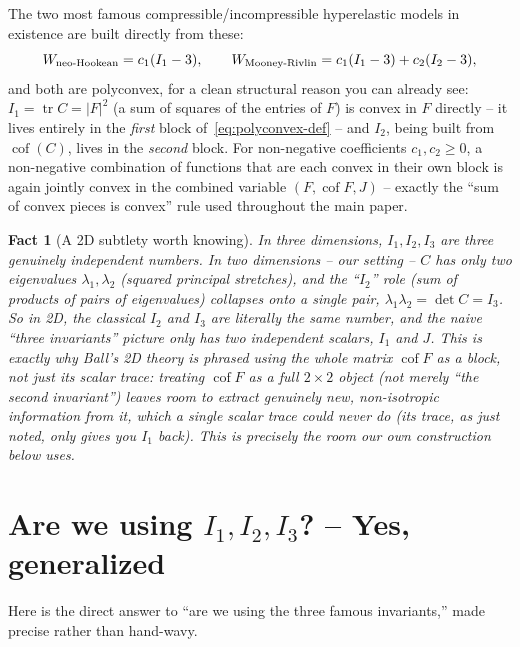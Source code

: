 \documentclass[11pt,a4paper]{article}
\newtheorem{fact}{Fact}
\newcommand{\Cof}{\operatorname{cof}}
\newcommand{\tr}{\operatorname{tr}}
\begin{document}
The two most famous compressible/incompressible hyperelastic models in
existence are built directly from these:
\[
 W_{\rm neo\text{-}Hookean}=c_1(I_1-3), \qquad
 W_{\rm Mooney\text{-}Rivlin}=c_1(I_1-3)+c_2(I_2-3),
\]
and both are polyconvex, for a clean structural reason you can already
see: $I_1=\tr C=|F|^2$ (a sum of squares of the entries of $F$) is
convex in $F$ directly -- it lives entirely in the \emph{first} block
of~\eqref{eq:polyconvex-def} -- and $I_2$, being built from $\Cof(C)$,
lives in the \emph{second} block. For non-negative coefficients $c_1,
c_2\geq0$, a non-negative combination of functions that are each convex
in their own block is again jointly convex in the combined variable
$(F,\Cof F,J)$ -- exactly the ``sum of convex pieces is convex'' rule
used throughout the main paper.

\begin{fact}[A 2D subtlety worth knowing]
\label{fact:2d-degeneracy}
In three dimensions, $I_1,I_2,I_3$ are three genuinely independent
numbers. In two dimensions -- our setting -- $C$ has only two
eigenvalues $\lambda_1,\lambda_2$ (squared principal stretches), and
the ``$I_2$'' role (sum of products of pairs of eigenvalues) collapses
onto a single pair, $\lambda_1\lambda_2=\det C=I_3$. So in 2D, the
classical $I_2$ and $I_3$ are literally the same number, and the naive
``three invariants'' picture only has two independent scalars,
$I_1$ and $J$. This is exactly why Ball's 2D theory is phrased using
the whole \emph{matrix} $\Cof F$ as a block, not just its scalar trace:
treating $\Cof F$ as a full $2\times2$ object (not merely
``the second invariant'') leaves room to extract genuinely new,
non-isotropic information from it, which a single scalar trace could
never do (its trace, as just noted, only gives you $I_1$ back). This is
precisely the room our own construction below uses.
\end{fact}

\section{Are we using $I_1,I_2,I_3$? -- Yes, generalized}
\label{sec:are-we-using-them}

Here is the direct answer to ``are we using the three famous
invariants,'' made precise rather than hand-wavy.
\end{document}
